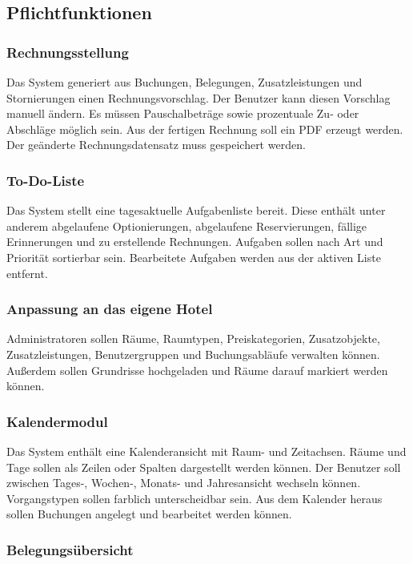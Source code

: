 \subsection{Pflichtfunktionen}

\subsubsection{Rechnungsstellung}

Das System generiert aus Buchungen, Belegungen, Zusatzleistungen und Stornierungen einen Rechnungsvorschlag. Der Benutzer kann diesen Vorschlag manuell ändern. Es müssen Pauschalbeträge sowie prozentuale Zu- oder Abschläge möglich sein. Aus der fertigen Rechnung soll ein PDF erzeugt werden. Der geänderte Rechnungsdatensatz muss gespeichert werden.

\subsubsection{To-Do-Liste}

Das System stellt eine tagesaktuelle Aufgabenliste bereit. Diese enthält unter anderem abgelaufene Optionierungen, abgelaufene Reservierungen, fällige Erinnerungen und zu erstellende Rechnungen. Aufgaben sollen nach Art und Priorität sortierbar sein. Bearbeitete Aufgaben werden aus der aktiven Liste entfernt.

\subsubsection{Anpassung an das eigene Hotel}

Administratoren sollen Räume, Raumtypen, Preiskategorien, Zusatzobjekte, Zusatzleistungen, Benutzergruppen und Buchungsabläufe verwalten können. Außerdem sollen Grundrisse hochgeladen und Räume darauf markiert werden können.

\subsubsection{Kalendermodul}

Das System enthält eine Kalenderansicht mit Raum- und Zeitachsen. Räume und Tage sollen als Zeilen oder Spalten dargestellt werden können. Der Benutzer soll zwischen Tages-, Wochen-, Monats- und Jahresansicht wechseln können. Vorgangstypen sollen farblich unterscheidbar sein. Aus dem Kalender heraus sollen Buchungen angelegt und bearbeitet werden können.

\subsubsection{Belegungsübersicht}


